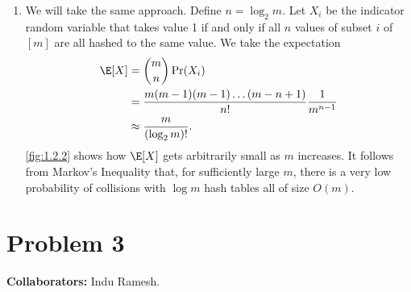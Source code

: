 \begin{enumerate}
    \item We will take the same approach.
    Define $n = \log_2 m$.
    Let $X_i$ be the indicator random variable that takes value
    1 if and only if all $n$ values of subset $i$ of $[m]$ are all hashed
    to the same value.
    We take the expectation
    \begin{align}
        \E[X] &= \binom{m}{n} \Pr(X_i) \nonumber \\
        &= \frac{m(m-1)(m-1)\dots(m-n+1)}{n!} \frac{1}{m^{n-1}} \nonumber \\
        & \approx \frac{m}{(\log_2 m)!}.
        \nonumber
    \end{align}
    \autoref{fig:1.2.2} shows how $\E[X]$ gets arbitrarily small
    as $m$ increases.
    It follows from Markov's Inequality that, for sufficiently large $m$,
    there is a very low probability of collisions with
    $\log m$ hash tables all of size $O(m)$.
    \qedsymbol
\end{enumerate}   



\newpage
\section*{Problem 3}
\textbf{Collaborators:}  Indu Ramesh.
\medskip

